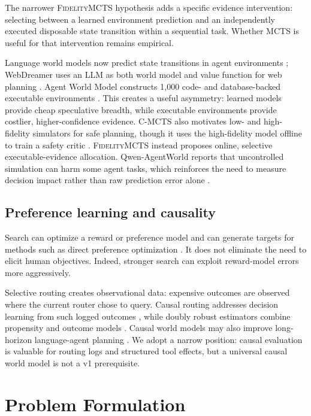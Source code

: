 \documentclass[10pt,twocolumn]{article}
\newcommand{\method}{\textsc{FidelityMCTS}\xspace}
\begin{document}
The narrower \method hypothesis adds a specific evidence intervention:
selecting between a learned environment prediction and an independently
executed disposable state transition within a sequential task. Whether MCTS is
useful for that intervention remains empirical.

Language world models now predict state transitions in agent environments
\citep{zuo2026qwenagentworld}; WebDreamer uses an LLM as both world model and
value function for web planning \citep{gu2025webdreamer}. Agent World Model
constructs 1,000 code- and database-backed executable environments
\citep{wang2026agentworld}. This creates a useful asymmetry: learned models
provide cheap speculative breadth, while executable environments provide
costlier, higher-confidence evidence. C-MCTS also motivates low- and
high-fidelity simulators for safe planning, though it uses the high-fidelity
model offline to train a safety critic \citep{parthasarathy2024cmcts}.
\method instead proposes online, selective executable-evidence allocation.
Qwen-AgentWorld reports that uncontrolled simulation can harm some agent tasks,
which reinforces the need to measure decision impact rather than raw prediction
error alone \citep{zuo2026qwenagentworld}.

\subsection{Preference learning and causality}

Search can optimize a reward or preference model and can generate targets for
methods such as direct preference optimization
\citep{rafailov2024dpo,xu2025mctsep}. It does not eliminate the need to elicit
human objectives. Indeed, stronger search can exploit reward-model errors more
aggressively.

Selective routing creates observational data: expensive outcomes are observed
where the current router chose to query. Causal routing addresses decision
learning from such logged outcomes \citep{tsiourvas2025causalrouting}, while
doubly robust estimators combine propensity and outcome models
\citep{dudik2011doubly}. Causal world models may also improve long-horizon
language-agent planning \citep{gkountouras2025causality}. We adopt a narrow
position: causal evaluation is valuable for routing logs and structured tool
effects, but a universal causal world model is not a v1 prerequisite.

\section{Problem Formulation}
\end{document}
